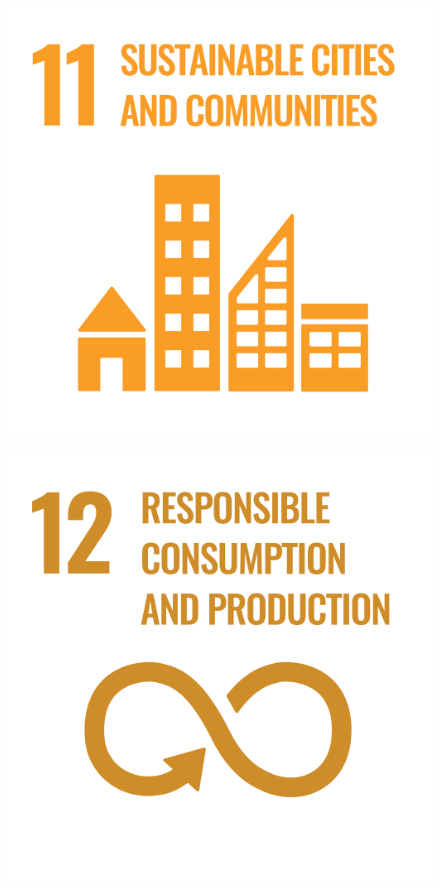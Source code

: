 \documentclass[../SustainableHEP.tex]{subfiles}
\begin{document}
\begin{figure}
\includegraphics[width=\SDGsize]{Sections/Figs/Common/SDG_11_SustainableCities.png}~%
\includegraphics[width=\SDGsize]{Sections/Figs/Common/SDG_12_ResponsibleConsumption.png}~%

\end{figure}
\end{document}
